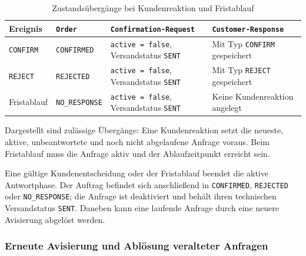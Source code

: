 \begin{table}[htbp]
  \centering
  \caption{Zustandsübergänge bei Kundenreaktion und Fristablauf}
  \label{tab:kundenreaktion-fristablauf}
  \small
  \setlength{\tabcolsep}{4pt}
  \begin{tabularx}{\textwidth}{@{}>{\raggedright\arraybackslash}p{}>{\raggedright\arraybackslash}p{}>{\raggedright\arraybackslash}p{}>{\raggedright\arraybackslash}X@{}}
    \toprule
    Ereignis & \texttt{Order} & \texttt{Confirmation-}\newline\texttt{Request} & \texttt{Customer-}\newline\texttt{Response} \\
    \midrule
    \texttt{CONFIRM} & \texttt{CONFIRMED}
      & \texttt{active = false}, Versandstatus \texttt{SENT}
      & Mit Typ \texttt{CONFIRM} gespeichert \\
    \texttt{REJECT} & \texttt{REJECTED}
      & \texttt{active = false}, Versandstatus \texttt{SENT}
      & Mit Typ \texttt{REJECT} gespeichert \\
    Fristablauf & \texttt{NO\_RESPONSE}
      & \texttt{active = false}, Versandstatus \texttt{SENT}
      & Keine Kundenreaktion angelegt \\
    \bottomrule
  \end{tabularx}
  \par\smallskip
  \begin{minipage}{\textwidth}
    \footnotesize
    Dargestellt sind zulässige Übergänge: Eine Kundenreaktion setzt die neueste,
    aktive, unbeantwortete und noch nicht abgelaufene Anfrage voraus.
    Beim Fristablauf muss die Anfrage aktiv und der Ablaufzeitpunkt erreicht sein.
  \end{minipage}
\end{table}

Eine gültige Kundenentscheidung oder der Fristablauf beendet die aktive
Antwortphase. Der Auftrag befindet sich anschließend in
\texttt{CONFIRMED}, \texttt{REJECTED} oder \texttt{NO\_RESPONSE}; die Anfrage
ist deaktiviert und behält ihren technischen Versandstatus \texttt{SENT}.
Daneben kann eine laufende Anfrage durch eine neuere Avisierung abgelöst
werden.

\subsubsection{Erneute Avisierung und Ablösung veralteter Anfragen}
\label{sec:erneute-avisierung}


